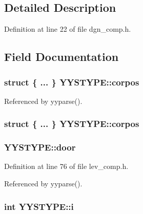 \subsection{Detailed Description}


Definition at line 22 of file dgn\+\_\+comp.\+h.



\subsection{Field Documentation}
\hypertarget{unionYYSTYPE_ab9c0c90ca4e13a1822d08a472f2b0a98}{
\subsubsection[{corpos}]{\setlength{\rightskip}{0pt plus 5cm}struct \{ ... \}   Y\+Y\+S\+T\+Y\+P\+E\+::corpos}}\label{unionYYSTYPE_ab9c0c90ca4e13a1822d08a472f2b0a98}


Referenced by yyparse().

\hypertarget{unionYYSTYPE_a8b11f3ef52bee805402f4dce39f04341}{
\subsubsection[{corpos}]{\setlength{\rightskip}{0pt plus 5cm}struct \{ ... \}   Y\+Y\+S\+T\+Y\+P\+E\+::corpos}}\label{unionYYSTYPE_a8b11f3ef52bee805402f4dce39f04341}
\hypertarget{unionYYSTYPE_aec49c5d1cefb3c79cd696e7c5c5cf41d}{
\subsubsection[{door}]{ Y\+Y\+S\+T\+Y\+P\+E\+::door}}\label{unionYYSTYPE_aec49c5d1cefb3c79cd696e7c5c5cf41d}


Definition at line 76 of file lev\+\_\+comp.\+h.



Referenced by yyparse().

\hypertarget{unionYYSTYPE_ac818758881756c0236e9c66531f0981b}{
\subsubsection[{i}]{\setlength{\rightskip}{0pt plus 5cm}int Y\+Y\+S\+T\+Y\+P\+E\+::i}}\label{unionYYSTYPE_ac818758881756c0236e9c66531f0981b}


